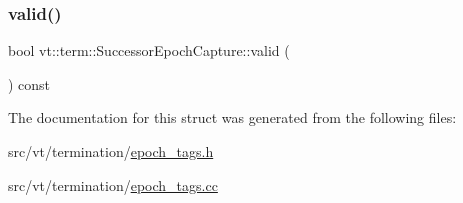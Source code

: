 \subsubsection{\texorpdfstring{valid()}{valid()}}
{\footnotesize\ttfamily bool vt\+::term\+::\+Successor\+Epoch\+Capture\+::valid (\begin{DoxyParamCaption}{ }\end{DoxyParamCaption}) const\hspace{0.3cm}{\ttfamily [inline]}}



The documentation for this struct was generated from the following files\+:\begin{DoxyCompactItemize}
\item 
src/vt/termination/\hyperlink{epoch__tags_8h}{epoch\+\_\+tags.\+h}\item 
src/vt/termination/\hyperlink{epoch__tags_8cc}{epoch\+\_\+tags.\+cc}\end{DoxyCompactItemize}
